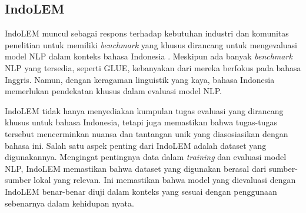 \subsection{IndoLEM}

IndoLEM muncul sebagai respons terhadap kebutuhan industri dan komunitas penelitian untuk memiliki \textit{benchmark} yang khusus dirancang untuk mengevaluasi model NLP dalam konteks bahasa Indonesia \parencite{indobert}. Meskipun ada banyak \textit{benchmark} NLP yang tersedia, seperti GLUE, kebanyakan dari mereka berfokus pada bahasa Inggris. Namun, dengan keragaman linguistik yang kaya, bahasa Indonesia memerlukan pendekatan khusus dalam evaluasi model NLP.

IndoLEM tidak hanya menyediakan kumpulan tugas evaluasi yang dirancang khusus untuk bahasa Indonesia, tetapi juga memastikan bahwa tugas-tugas tersebut mencerminkan nuansa dan tantangan unik yang diasosiasikan dengan bahasa ini. Salah satu aspek penting dari IndoLEM adalah dataset yang digunakannya. Mengingat pentingnya data dalam \textit{training} dan evaluasi model NLP, IndoLEM memastikan bahwa dataset yang digunakan berasal dari sumber-sumber lokal yang relevan. Ini memastikan bahwa model yang dievaluasi dengan IndoLEM benar-benar diuji dalam konteks yang sesuai dengan penggunaan sebenarnya dalam kehidupan nyata.